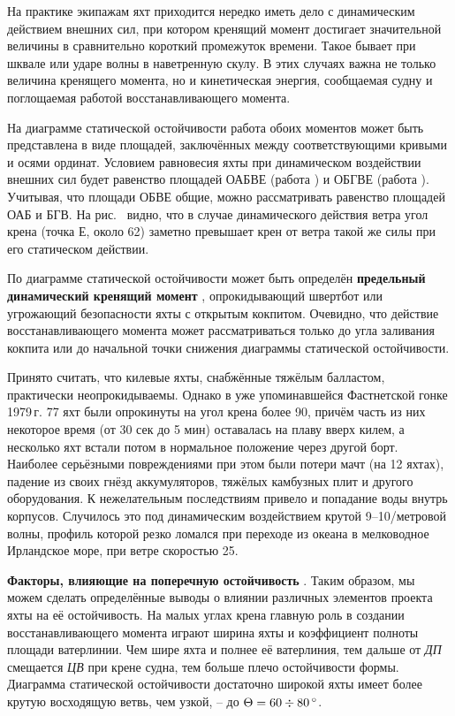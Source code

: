 На практике экипажам яхт приходится нередко иметь дело с динамическим
действием внешних сил, при котором кренящий момент достигает
значительной величины в сравнительно короткий промежуток
времени. Такое бывает при шквале или ударе волны в наветренную
скулу. В этих случаях важна не только величина кренящего момента, но и
кинетическая энергия, сообщаемая судну и поглощаемая работой
восстанавливающего момента.

На диаграмме статической остойчивости работа обоих моментов может быть
представлена в виде площадей, заключённых между соответствующими
кривыми и осями ординат. Условием равновесия яхты при динамическом
воздействии внешних сил будет равенство площадей ОАБВЕ (работа
) и ОБГВЕ (работа ). Учитывая, что площади ОБВЕ
общие, можно рассматривать равенство площадей ОАБ и БГВ. На
рис.~ видно, что в случае динамического действия ветра угол
крена (точка Е, около 62\gr) заметно превышает крен от ветра такой же
силы при его статическом действии.

По диаграмме статической остойчивости может быть определён
\textbf{предельный динамический кренящий момент}
, опрокидывающий
швертбот или угрожающий безопасности яхты с открытым
кокпитом. Очевидно, что действие восстанавливающего момента может
рассматриваться только до угла заливания кокпита или до начальной
точки снижения диаграммы статической остойчивости.

Принято считать, что килевые яхты, снабжённые тяжёлым балластом,
практически неопрокидываемы. Однако в уже упоминавшейся Фастнетской
гонке 1979\,г. 77 яхт были опрокинуты на угол крена более 90\gr,
причём часть из них некоторое время (от 30 сек до 5 мин) оставалась на
плаву вверх килем, а несколько яхт встали потом в нормальное положение
через другой борт. Наиболее серьёзными повреждениями при этом были
потери мачт (на 12 яхтах), падение из своих гнёзд аккумуляторов,
тяжёлых камбузных плит и другого оборудования. К нежелательным
последствиям привело и попадание воды внутрь корпусов. Случилось это
под динамическим воздействием крутой 9--10\-/метровой волны, профиль
которой резко ломался при переходе из океана в мелководное Ирландское
море, при ветре скоростью 25\speedms.

\textbf{Факторы, влияющие на поперечную остойчивость}
. Таким образом,
мы можем сделать определённые выводы о влиянии различных элементов
проекта яхты на её остойчивость. На малых углах крена главную роль в
создании восстанавливающего момента играют ширина яхты и коэффициент
полноты площади ватерлинии. Чем шире яхта и полнее её ватерлиния, тем
дальше от \textit{ДП} смещается \textit{ЦВ} при крене судна, тем
больше плечо остойчивости формы. Диаграмма статической остойчивости
достаточно широкой яхты имеет более крутую восходящую ветвь, чем
узкой, \--- до $\Theta = 60 \div 80\,^\circ$.

